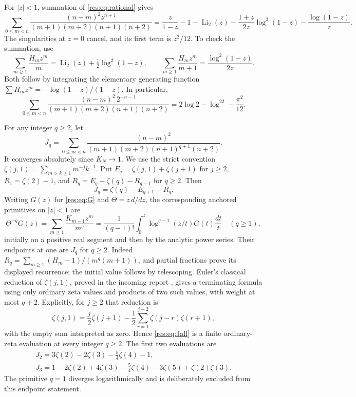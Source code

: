 For $|z|<1$, summation of \eqref{res:eq:rational} gives
\begin{equation}
 \boxed{\sum_{0\leq m<n}
   \frac{(n-m)^2z^{n+1}}{(m+1)(m+2)(n+1)(n+2)}
 =\frac{z}{1-z}-1-\operatorname{Li}_2(z)
  -\frac{1+z}{2z}\log^2(1-z)-\frac{\log(1-z)}z.}
 \label{res:eq:G}
\end{equation}
The singularities at $z=0$ cancel, and its first term is $z^2/12$.
To check the summation, use
\[
 \sum_{m\geq1}\frac{H_mz^m}{m}
   =\operatorname{Li}_2(z)+\tfrac12\log^2(1-z),\qquad
 \sum_{m\geq1}\frac{H_mz^m}{m+1}
   =\frac{\log^2(1-z)}{2z}.
\]
Both follow by integrating the elementary generating function
$\sum H_mz^m=-\log(1-z)/(1-z)$.
In particular,
\begin{equation}
 \sum_{0\leq m<n}\frac{(n-m)^2\,2^{-n-1}}
 {(m+1)(m+2)(n+1)(n+2)}
 =2\log2-\log^22-\frac{\pi^2}{12}.\label{res:eq:half}
\end{equation}

For any integer $q\geq2$, let
\[
 J_q=\sum_{0\leq m<n}\frac{(n-m)^2}
 {(m+1)(m+2)(n+1)^{q+1}(n+2)}.
\]
It converges absolutely since $K_N\to1$.  We use the strict convention
$\zeta(j,1)=\sum_{m>k\geq1}m^{-j}k^{-1}$.  Put
$E_j=\zeta(j,1)+\zeta(j+1)$ for $j\geq2$,
$R_1=\zeta(2)-1$, and
$R_q=E_q-\zeta(q)-R_{q-1}$ for $q\geq2$.  Then
\begin{equation}
 J_q=\zeta(q)-E_{q+1}-R_q.\label{res:eq:Jall}
\end{equation}
Writing $G(z)$ for \eqref{res:eq:G} and $\Theta=z\,d/dz$, the
corresponding anchored primitives on $|z|<1$ are
\[
 \Theta^{-q}G(z)=\sum_{m\geq1}\frac{K_{m-1}z^m}{m^q}
  =\frac1{(q-1)!}\int_0^z\log^{q-1}(z/t)G(t)\frac{dt}{t}
       \quad(q\geq1),
\]
initially on a positive real segment and then by the analytic power
series.  Their endpoints at one are $J_q$ for $q\geq2$.
Indeed $R_q=\sum_{m\geq1}(H_m-1)/(m^q(m+1))$, and partial
fractions prove its displayed recurrence; the initial value follows
by telescoping.  Euler's classical reduction of $\zeta(j,1)$,
proved in the incoming report \cite[Section 6]{DHR}, gives
a terminating formula using only ordinary zeta values and products
of two such values, with weight at most $q+2$.
Explicitly, for $j\ge2$ that reduction is
\[
 \zeta(j,1)=\frac j2\zeta(j+1)
       -\frac12\sum_{r=1}^{j-2}\zeta(j-r)\zeta(r+1),
\]
with the empty sum interpreted as zero. Hence
\eqref{res:eq:Jall} is a finite ordinary-zeta evaluation at every
integer $q\ge2$.
The first two evaluations are
\begin{align}
 \boxed{J_2=3\zeta(2)-2\zeta(3)-\tfrac54\zeta(4)-1,}
 \label{res:eq:J2}\\
 J_3=1-2\zeta(2)+4\zeta(3)-\tfrac54\zeta(4)
                         -3\zeta(5)+\zeta(2)\zeta(3).
 \label{res:eq:J3}
\end{align}
The primitive $q=1$ diverges logarithmically and is deliberately
excluded from this endpoint statement.

